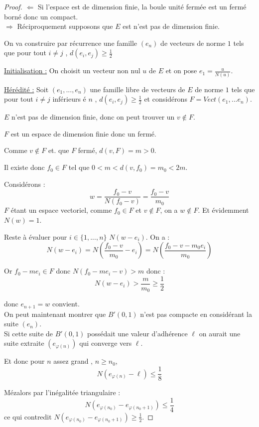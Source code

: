 \begin{proof}
$\Leftarrow$ Si l'espace est de dimension finie, la boule unité fermée est un fermé borné donc un compact.\\

$\Rightarrow$ Réciproquement supposons que $E$ est n'est pas de dimension finie.

On va construire par récurrence une famille  $(e_n)$ de vecteurs de norme $1$ tels que pour tout $i\neq j$ , 
$d(e_i,e_j) \geqslant \frac 1 2$

\uline{Initialisation :} On choisit un vecteur non nul $u$ de $E$ et on pose $e_1=\frac u{N(u)}$.

\uline{Hérédité :} Soit $(e_1,..., e_n)$ une famille libre de vecteurs de $E$ de norme $1$  tels que pour tout $i\neq j$ inf\'erieurs \'e $n$ , 
$d(e_i,e_j) \geqslant \frac 1 2$
et considérons $F=Vect(e_1,...e_n)$.

$E$ n'est pas de dimension finie, donc on peut trouver un $v \notin F$.

$F$ est un espace de dimension finie donc un fermé.

Comme $v \notin F $ et. que $F$ fermé, $d(v,F)=m>0$.

Il existe donc $f_0\in F$ tel que $0<m<d(v,f_0)=m_0<2 m$.

Considérons : \[w=\frac{f_0-v}{N(f_0-v)}=\frac{f_0-v}{m_0}\]
$F$ étant un espace vectoriel, comme $f_0 \in F$ et $v \notin F$, on a  $w\notin F$.
Et évidemment $N(w)=1$.

Reste à évaluer pour $i \in \{1,...,n\}$ $N(w-e_i)$.
On a :
\[N(w-e_i)=N\left(\frac{f_0-v}{m_0}-e_i\right)=N\left(\frac{f_0-v-m_0 e_i}{m_0}\right)\]

Or $f_0-me_i \in F$ donc $N(f_0-me_i-v)>m$ donc :
\[N(w-e_i)> \frac{m}{m_0}\geqslant \frac 1 2\]

donc $e_{n+1}=w$ convient. \\

On peut maintenant montrer que $B'(0,1)$ n'est pas compacte en considérant la suite  $(e_n)$.\\
Si cette suite de $B'(0,1)$ possédait une valeur d'adhérence $\ell$ on aurait une suite extraite 
$(e_{\varphi(n)})$ qui converge vers $\ell$.

Et donc pour $n$ assez grand , $n\geqslant n_0$, 
\[N(e_{\varphi(n)}-\ell) \leqslant \frac 1 8\]
 
Mézalors par l'inégalitée triangulaire : \[N(e_{\varphi(n_0)}-e_{\varphi(n_0+1)})\leqslant \frac 1 4\]
ce qui contredit $N(e_{\varphi(n_0)}-e_{\varphi(n_0+1)}) \geqslant \frac 1 2$.
\end{proof}

